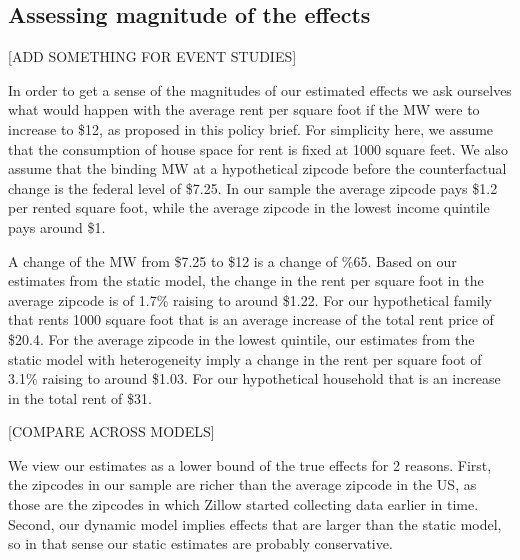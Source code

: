 \subsection{Assessing magnitude of the effects}\label{subsec:results/magnitude}

    [ADD SOMETHING FOR EVENT STUDIES]

    In order to get a sense of the magnitudes of our estimated effects we ask ourselves what would happen with the average rent per square foot if the MW were to increase to \$12, as proposed in this policy brief. For simplicity here, we assume that the consumption of house space for rent is fixed at 1000 square feet. We also assume that the binding MW at a hypothetical zipcode before the counterfactual change is the federal level of \$7.25. In our sample the average zipcode pays \$1.2 per rented square foot, while the average zipcode in the lowest income quintile pays around \$1.
    
    A change of the MW from \$7.25 to \$12 is a change of \%65. Based on our estimates from the static model, the change in the rent per square foot in the average zipcode is of 1.7\% raising to around \$1.22. For our hypothetical family that rents 1000 square foot that is an average increase of the total rent price of \$20.4. For the average zipcode in the lowest quintile, our estimates from the static model with heterogeneity imply a change in the rent per square foot of 3.1\% raising to around \$1.03. For our hypothetical household that is an increase in the total rent of \$31.
    
    [COMPARE ACROSS MODELS]
    
    We view our estimates as a lower bound of the true effects for 2 reasons. First, the zipcodes in our sample are richer than the average zipcode in the US, as those are the zipcodes in which Zillow started collecting data earlier in time. Second, our dynamic model implies effects that are larger than the static model, so in that sense our static estimates are probably conservative.
